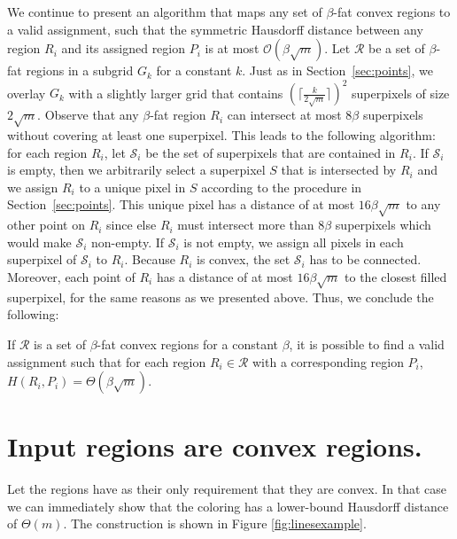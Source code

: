 \documentclass[a4paper,UKenglish,cleveref]{lipics-v2019}
\begin{document}
We continue to present an algorithm that maps any set of $\beta$-fat convex regions to a valid assignment, such that the symmetric Hausdorff distance between any region $R_i$ and its assigned region $P_i$ is at most $\mathcal{O}(\beta \sqrt{m})$. Let $\mathcal{R}$ be a set of $\beta$-fat regions in a subgrid $G_k$ for a constant $k$. Just as in Section~\ref{sec:points}, we overlay $G_k$ with a slightly larger grid that contains $(\lceil \frac{k}{2\sqrt{m}} \rceil)^2$ superpixels of size $2\sqrt{m}$. Observe that any $\beta$-fat region $R_i$ can intersect at most $8\beta$ superpixels without covering at least one superpixel. This leads to the following algorithm: for each region $R_i$, let $\mathcal{S}_i$ be the set of superpixels that are contained in $R_i$. If $\mathcal{S}_i$ is empty, then we arbitrarily select a superpixel $S$ that is intersected by $R_i$ and we assign $R_i$ to a unique pixel in $S$ according to the procedure in Section~\ref{sec:points}. This unique pixel has a distance of at most $16\beta \sqrt{m}$ to any other point on $R_i$ since else $R_i$ must intersect more than $8\beta$ superpixels which would make $\mathcal{S}_i$ non-empty. If $\mathcal{S}_i$ is not empty, we assign all pixels in each superpixel of $\mathcal{S}_i$ to $R_i$. Because $R_i$ is convex, the set $\mathcal{S}_i$ has to be connected. Moreover, each point of $R_i$ has a distance of at most $16\beta \sqrt{m}$ to the closest filled superpixel, for the same reasons as we presented above. Thus, we conclude the following:


\begin{theorem}
If $\mathcal{R}$ is a set of $\beta$-fat convex regions for a constant $\beta$, it is possible to find a valid assignment such that for each region $R_i \in \mathcal{R}$ with a corresponding region $P_i$, $H(R_i, P_i) = \Theta(\beta\sqrt{m})$.
\end{theorem}


\section{Input regions are convex regions.}\label{sec:convex}
Let the regions have as their only requirement that they are convex. In that case we can immediately show that the coloring has a lower-bound Hausdorff distance of $\Theta(m)$. The construction is shown in Figure \ref{fig:linesexample}.
\end{document}
